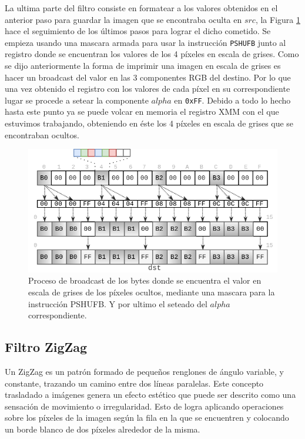 \documentclass[a4paper]{article}
\begin{document}
La ultima parte del filtro consiste en formatear a los valores obtenidos en el anterior paso para guardar la imagen que se encontraba oculta en $src$, la Figura \ref{fig:filtro-descubrir-3} hace el seguimiento de los últimos pasos para lograr el dicho cometido.
Se empieza usando una mascara armada para usar la instrucción \texttt{PSHUFB} junto al registro donde se encuentran los valores de los 4 píxeles en escala de grises. Como se dijo anteriormente la forma de imprimir una imagen en escala de grises es hacer un broadcast del valor en las 3 componentes RGB del destino. Por lo que una vez obtenido el registro con los valores de cada píxel en su correspondiente lugar se procede a setear la componente $alpha$ en \texttt{0xFF}. Debido a todo lo hecho hasta este punto ya se puede volcar en memoria el registro XMM con el que estuvimos trabajando, obteniendo en éste los 4 píxeles en escala de grises que se encontraban ocultos.

\begin{figure}[h!]
  \begin{center}
	\includegraphics[scale=0.47]{images/filtro-descubrir-3.png}
	\caption{Proceso de broadcast de los bytes donde se encuentra el valor en escala de grises de los píxeles ocultos, mediante una mascara para la instrucción PSHUFB. Y por ultimo el seteado del $alpha$ correspondiente.}
 	\label{fig:filtro-descubrir-3}
  \end{center}
\end{figure}


\newpage

\subsection{Filtro ZigZag}

Un ZigZag es un patrón formado de pequeños renglones de ángulo variable, y constante, trazando un camino entre dos líneas paralelas. Este concepto trasladado a imágenes genera un efecto estético que puede ser descrito como una sensación de movimiento o irregularidad. Esto de logra aplicando operaciones sobre los píxeles de la imagen según la fila en la que se encuentren y colocando un borde blanco de dos píxeles alrededor de la misma. 
\end{document}

